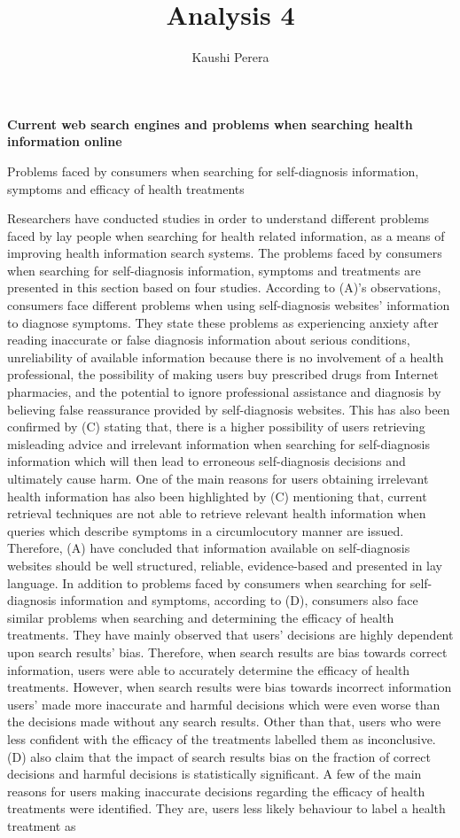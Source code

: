 \documentclass[]{article}
\title{Analysis 4}
\author{Kaushi Perera}
\begin{document}
	
\maketitle
	
\textbf{Current web search engines and problems when searching health information online}

Problems faced by consumers when searching for self-diagnosis information, symptoms and efficacy of health treatments


Researchers have conducted studies in order to understand different problems faced by lay people when searching for health related information, as a means of improving health information search systems. The problems faced by consumers when searching for self-diagnosis information, symptoms and treatments are presented in this section based on four studies. According to (A)'s observations, consumers face different problems when using self-diagnosis websites' information to diagnose symptoms. They state these problems as experiencing anxiety after reading inaccurate or false diagnosis information about serious conditions, unreliability of available information because there is no involvement of a health professional, the possibility of making users buy prescribed drugs from Internet pharmacies, and the potential to ignore professional assistance and diagnosis by believing false reassurance provided by self-diagnosis websites. This has also been confirmed by (C) stating that, there is a higher possibility of users retrieving misleading advice and irrelevant information when searching for self-diagnosis information which will then lead to erroneous self-diagnosis decisions and ultimately cause harm. One of the main reasons for users obtaining irrelevant health information has also been highlighted by (C) mentioning that, current retrieval techniques are not able to retrieve relevant health information when queries which describe symptoms in a circumlocutory manner are issued. Therefore, (A) have concluded that information available on self-diagnosis websites should be well structured, reliable, evidence-based and presented in lay language. In addition to problems faced by consumers when searching for self-diagnosis information and symptoms, according to (D), consumers also face similar problems when searching and determining the efficacy of health treatments. They have mainly observed that users' decisions are highly dependent upon search results' bias. Therefore, when search results are bias towards correct information, users were able to accurately determine the efficacy of health treatments. However, when search results were bias towards incorrect information users’ made more inaccurate and harmful decisions which were even worse than the decisions made without any search results. Other than that, users who were less confident with the efficacy of the treatments labelled them as inconclusive. (D) also claim that the impact of search results bias on the fraction of correct decisions and harmful decisions is statistically significant. A few of the main reasons for users making inaccurate decisions regarding the efficacy of health treatments were identified. They are, users less likely behaviour to label a health treatment as 
\end{document}
